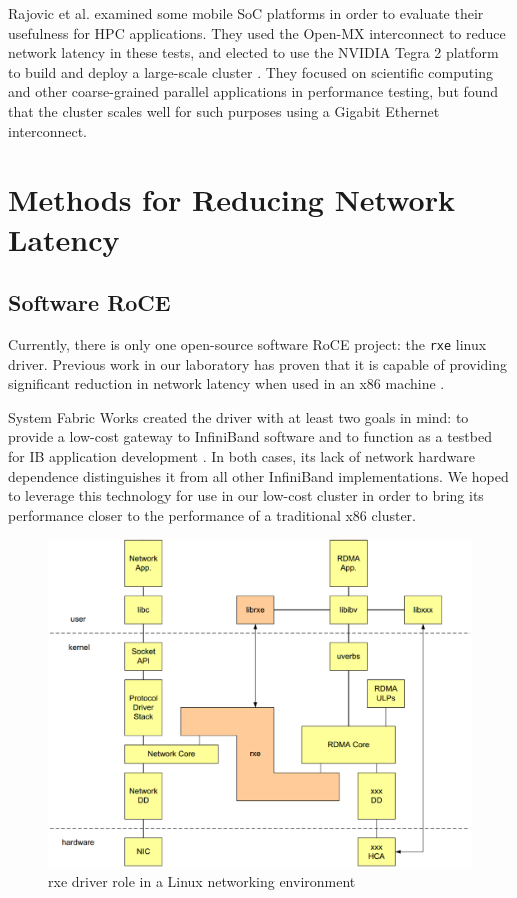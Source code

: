 \documentclass[11pt]{book}
\begin{document}
Rajovic et al. \cite{rajovic-13} examined some mobile SoC platforms in order to
evaluate their usefulness for HPC applications. They used the Open-MX
interconnect to reduce network latency in these tests, and elected to use the
NVIDIA Tegra 2 platform to build and deploy a large-scale cluster
\cite{rajovic-14}. They focused on scientific computing and other coarse-grained
parallel applications in performance testing, but found that the cluster scales
well for such purposes using a Gigabit Ethernet interconnect.

\newpage
\chapter{Methods for Reducing Network Latency}
\label{latency_reduction}

\section{\textbf{Software RoCE}}

Currently, there is only one open-source software RoCE project: the \verb;rxe;
linux driver. Previous work in our laboratory has proven that it is capable of
providing significant reduction in network latency when used in an x86 machine
\cite{lancaster-10}.

System Fabric Works created the driver with at least two goals in
mind: to provide a low-cost gateway to InfiniBand software and to function as a
testbed for IB application development \cite{pearson-10}. In both cases, its
lack of network hardware dependence distinguishes it from all other InfiniBand
implementations. We hoped to leverage this technology for use in our low-cost
cluster in order to bring its performance closer to the performance of a
traditional x86 cluster.

\begin{figure}[h]
\includegraphics[width=\textwidth]{rxe_linux}
\caption{rxe driver role in a Linux networking environment \cite{pearson-10}}
\label{rxe-linux}
\end{figure}
\end{document}
